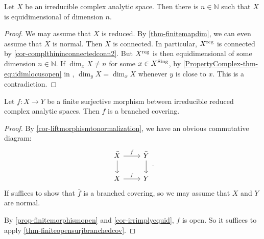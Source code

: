 \begin{corollary}\label{cor-irrimplyequid}
    Let $X$ be an irreducible complex analytic space. Then there is $n\in \mathbb{N}$ such that $X$ is equidimensional of dimension $n$.
\end{corollary}
\begin{proof}
    We may assume that $X$ is reduced. By \cref{thm-finitemapdim}, we can even assume that $X$ is normal. Then $X$ is connected. In particular, $X^{\operatorname{reg}}$ is connected by \cref{cor-complthininconnectedconn2}. But $X^{\operatorname{reg}}$ is then equidimensional of some dimension $n\in \mathbb{N}$. If $\dim_x X\neq n$ for some $x\in X^{\operatorname{Sing}}$, by \cref{PropertyComplex-thm-equidimlocusopen} in , $\dim_y X=\dim_x X$ whenever $y$ is close to $x$. This is a contradiction.
\end{proof}



\begin{corollary}\label{cor-finitesurjbranchedcov2}
    Let $f:X\rightarrow Y$ be a finite surjective morphism between irreducible reduced complex analytic spaces. Then $f$ is a branched covering.
\end{corollary}
\begin{proof}
    By \cref{cor-liftmorphismtonormalization}, we have an obvious commutative diagram:
    \[
        \begin{tikzcd}
            \bar{X} \arrow[d] \arrow[r, "\bar{f}"] & \bar{Y} \arrow[d] \\
            X \arrow[r, "f"]                       & Y                
        \end{tikzcd}.  
    \]
    If suffices to show that $\bar{f}$ is a branched covering, so we may assume that $X$ and $Y$ are normal.

    By \cref{prop-finitemorphismopen} and \cref{cor-irrimplyequid}, $f$ is open. So it suffices to apply \cref{thm-finiteopensurjbranchedcov}.
\end{proof}

